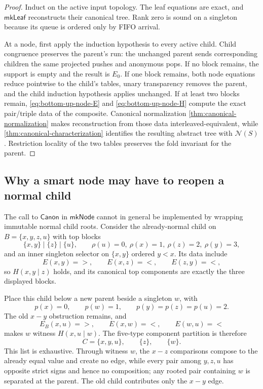 \begin{proof}
Induct on the active input topology.  The leaf equations are exact, and
\(\mathsf{mkLeaf}\) reconstructs their canonical tree.  Rank zero is sound
on a singleton because its queue is ordered only by FIFO arrival.

At a node, first apply the induction hypothesis to every active child.  Child
congruence preserves the parent's run: the unchanged parent sends
corresponding children the same projected pushes and anonymous pops.  If no block remains, the
support is empty and the result is \(E_0\).  If one block remains, both node
equations reduce pointwise to the child's tables, unary transparency removes
the parent, and the child induction hypothesis applies unchanged.  If at
   least two blocks remain, \autoref{eq:bottom-up-node-E} and
   \autoref{eq:bottom-up-node-H} compute the exact pair/triple data of the
   composite.  Canonical normalization
\autoref{thm:canonical-normalization} makes reconstruction from those data
interleaved-equivalent, while
\autoref{thm:canonical-characterization} identifies the resulting abstract
tree with \(\mathcal N(S)\).  Restriction locality of the two tables preserves
the fold invariant for the parent.
\end{proof}

\subsection{Why a smart node may have to reopen a normal child}

The call to \(\mathsf{Canon}\) in \(\mathsf{mkNode}\) cannot in general be
implemented by wrapping immutable normal child roots.  Consider the
already-normal child on
\(B=\{x,y,z,u\}\) with top blocks
\begin{equation}
 \{x,y\}\mid\{z\}\mid\{u\},
 \qquad
 \rho(u)=0,\ \rho(x)=1,\ \rho(z)=2,\ \rho(y)=3,
 \label{eq:bottom-up-five-child}
\end{equation}
and an inner singleton selector on \(\{x,y\}\) ordered \(y<x\).  Its data
include
\[
 E(x,y)=>,\qquad E(x,z)=<,\qquad E(z,y)=<,
\]
so \(H(x,y\mid z)\) holds, and its canonical top components are exactly the
three displayed blocks.

Place this child below a new parent beside a singleton \(w\), with
\begin{equation}
 p(x)=0,\qquad p(w)=1,\qquad p(y)=p(z)=p(u)=2.
 \label{eq:bottom-up-five-parent}
\end{equation}
The old \(x-y\) obstruction remains, and
\[
 E_B(x,u)=>,\qquad E(x,w)=<,\qquad E(w,u)=<
\]
makes \(w\) witness \(H(x,u\mid w)\).  The five-type component partition is
therefore
\begin{equation}
 C=\{x,y,u\},\qquad \{z\},\qquad \{w\}.
 \label{eq:bottom-up-five-components}
\end{equation}
This list is exhaustive.  Through witness \(w\), the \(x-z\) comparisons
compose to the already equal value and create no edge, while every pair among
\(y,z,u\) has opposite strict signs and hence no composition; any rooted pair
containing \(w\) is separated at the parent.  The old child contributes only
the \(x-y\) edge.

